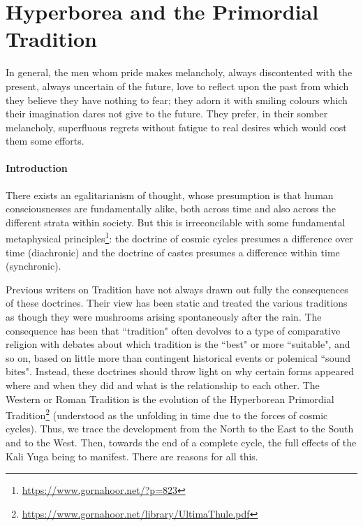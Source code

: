 \section{Hyperborea and the Primordial Tradition}

\label{sec:HyperboreaPrimordial}

\begin{quotex}
In general, the men whom pride makes melancholy, always discontented with the present, always uncertain of the future, love to reflect upon the past from which they believe they have nothing to fear; they adorn it with smiling colours which their imagination dares not give to the future. They prefer, in their somber melancholy, superfluous regrets without fatigue to real desires which would cost them some efforts. 

\end{quotex}
\paragraph{Introduction}
There exists an egalitarianism of thought, whose presumption is that human consciousnesses are fundamentally alike, both across time and also across the different strata within society. But this is irreconcilable with some fundamental metaphysical principles\footnote{\url{https://www.gornahoor.net/?p=823}}: the doctrine of cosmic cycles presumes a difference over time (diachronic) and the doctrine of castes presumes a difference within time (synchronic).

Previous writers on Tradition have not always drawn out fully the consequences of these doctrines. Their view has been static and treated the various traditions as though they were mushrooms arising spontaneously after the rain. The consequence has been that ``tradition" often devolves to a type of comparative religion with debates about which tradition is the ``best" or more ``suitable", and so on, based on little more than contingent historical events or polemical ``sound bites". Instead, these doctrines should throw light on why certain forms appeared where and when they did and what is the relationship to each other. The Western or Roman Tradition is the evolution of the Hyperborean Primordial Tradition\footnote{\url{https://www.gornahoor.net/library/UltimaThule.pdf}} (understood as the unfolding in time due to the forces of cosmic cycles). Thus, we trace the development from the North to the East to the South and to the West. Then, towards the end of a complete cycle, the full effects of the Kali Yuga being to manifest. There are reasons for all this.

